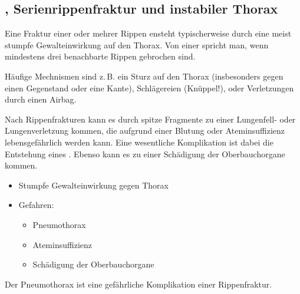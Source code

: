 



\subsection{, Serienrippenfraktur und 
instabiler Thorax}
\label{topic:serienrippenfraktur}

\TextSlide{{\TxBeschreibung}}
{%
Eine Fraktur einer oder mehrer Rippen ensteht typischerweise durch eine meist 
stumpfe Gewalteinwirkung auf den Thorax.
%
Von einer  spricht man,
wenn mindestens drei benachbarte Rippen gebrochen sind. 

Häufige Mechnismen sind z.\,B. 
ein Sturz auf den Thorax 
(insbesonders gegen einen Gegenstand oder eine Kante),
Schlägereien (Knüppel!), 
oder Verletzungen durch einen Airbag.

Nach Rippenfrakturen kann es durch spitze Fragmente 
zu einer Lungenfell- oder Lungenverletzung kommen,
die aufgrund einer Blutung 
oder Ateminsuffizienz lebensgefährlich werden kann. 
%
Eine wesentliche Komplikation ist dabei die Entstehung eines
. 
%
Ebenso kann es zu einer Schädigung der Oberbauchorgane kommen.

}{
\begin{itemize}
  \item Stumpfe Gewalteinwirkung gegen Thorax
  \item Gefahren:
  \begin{itemize}
    \item Pneumothorax
    \item Ateminsuffizienz
    \item Schädigung der Oberbauchorgane
  \end{itemize}
\end{itemize}
}{}{}{}

\begin{Danger}
  \item Der Pneumothorax ist eine gefährliche Komplikation einer Rippenfraktur.
\end{Danger}


